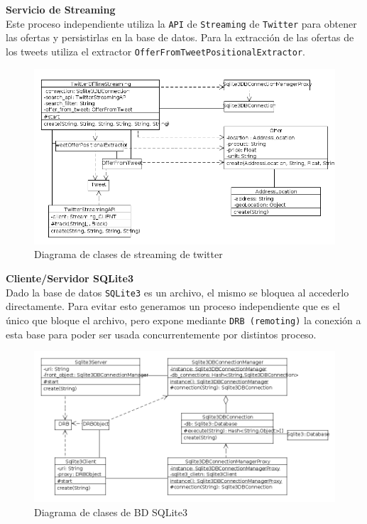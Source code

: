 \textbf{Servicio de Streaming}\\

Este proceso independiente utiliza la \texttt{API} de \texttt{Streaming} de \texttt{Twitter} para obtener las ofertas y persistirlas en la base de datos.
Para la extracción de las ofertas de los tweets utiliza el extractor \texttt{OfferFromTweetPositionalExtractor}.

\begin{figure}[h]
\centerline{\includegraphics[width=\textwidth]{./imgs/class_diagram_offline_streaming.png}}
\caption{Diagrama de clases de streaming de twitter}
\label{fig:class_offline_streaming}
\end{figure}


\textbf{Cliente/Servidor SQLite3}\\

Dado la base de datos \texttt{SQLite3} es un archivo, el mismo se bloquea al accederlo
directamente. Para evitar esto generamos un proceso independiente que es el único que bloque el archivo, pero expone mediante \texttt{DRB (remoting)} la conexión a esta base para poder ser usada concurrentemente por distintos proceso.

\begin{figure}[h]
\centerline{\includegraphics[width=\textwidth]{./imgs/class_diagram_sqlite3_client_server.png}}
\caption{Diagrama de clases de BD SQLite3}
\label{fig:class_sqlite3_client_server}
\end{figure}

